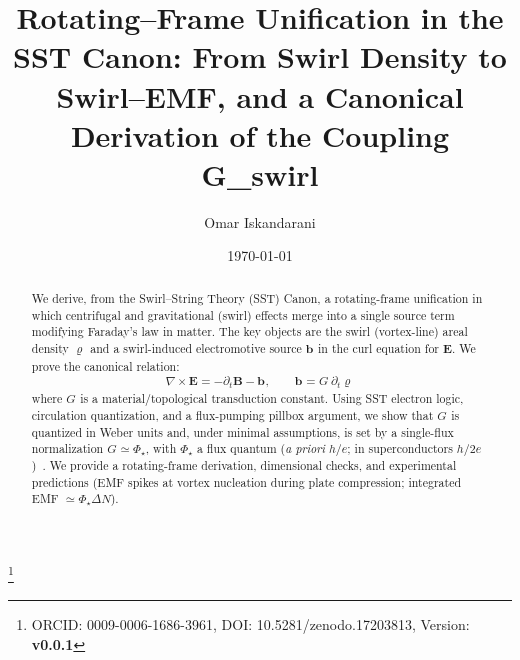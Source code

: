 \documentclass[10pt,reprint,aps,onecolumn,nofootinbib]{revtex4-2}
\def\boldsymbol#1{#1}%
\def\mathcal#1{#1}%
\def\swirlarrow{}%
\DeclareRobustCommand{\swirlarrow}{%
    \mathchoice{\mkern-2mu\scriptstyle\boldsymbol{\circlearrowleft}}%
    {\mkern-2mu\scriptstyle\boldsymbol{\circlearrowleft}}%
    {\mkern-2mu\scriptscriptstyle\boldsymbol{\circlearrowleft}}%
    {\mkern-2mu\scriptscriptstyle\boldsymbol{\circlearrowleft}}%
}
\newcommand{\paperversion}{\textbf{v0.0.1}}
\newcommand{\papertitle}{Rotating--Frame Unification in the SST Canon: From Swirl Density to Swirl--EMF, and a Canonical Derivation of the Coupling G_swirl}
\newcommand{\paperdoi}{10.5281/zenodo.17203813}
\begin{document}
	\title{\papertitle}
	\author{Omar Iskandarani}
	\thanks{ORCID: 0009-0006-1686-3961, DOI: \paperdoi, Version: \paperversion}
	\date{\today}

\begin{abstract}
We derive, from the Swirl--String Theory (SST) Canon, a rotating-frame unification in which centrifugal and gravitational (swirl) effects merge into a single source term modifying Faraday's law in matter. The key objects are the swirl (vortex-line) areal density $\bm{\varrho}_{\swirlarrow}$ and a swirl-induced electromotive source $\mathbf{b}_{\swirlarrow}$ in the curl equation for $\mathbf{E}$. We prove the canonical relation:
\begin{equation*}
    \nabla \times \mathbf{E} = -\partial_t \mathbf{B} - \mathbf{b}_{\swirlarrow}, \qquad
    \mathbf{b}_{\swirlarrow} = \mathcal{G}_{\swirlarrow}\,\partial_t \bm{\varrho}_{\swirlarrow}
\end{equation*}
where $\mathcal{G}_{\swirlarrow}$ is a material/topological transduction constant. Using SST electron logic, circulation quantization, and a flux-pumping pillbox argument, we show that $\mathcal{G}_{\swirlarrow}$ is quantized in Weber units and, under minimal assumptions, is set by a single-flux normalization $\mathcal{G}_{\swirlarrow} \simeq \Phi_\star$, with $\Phi_\star$ a flux quantum (\emph{a priori} $h/e$; in superconductors $h/2e$)~\cite{Aharonov1959,Tinkham2004,Onsager1949,Feynman1955}. We provide a rotating-frame derivation, dimensional checks, and experimental predictions (EMF spikes at vortex nucleation during plate compression; integrated EMF $\simeq \Phi_\star \Delta N$).
\end{abstract}
\maketitle
\end{document}
